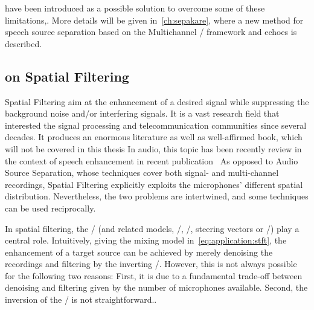  have been introduced as a possible solution to overcome some of these limitations,.
More details will be given in~\cref{ch:sepakare}, where a new method for speech source separation based on the Multichannel \NMF/ framework and echoes is described.

\subsection{on Spatial Filtering}\label{subsec:application:filtering}
Spatial Filtering aim at the enhancement of a desired signal while suppressing the background noise and/or interfering signals.
It is a vast research field that interested the signal processing and telecommunication communities since several decades.
It produces an enormous literature as well as well-affirmed book, which will not be covered in this thesis
In audio, this topic has been recently review in the context of speech enhancement in recent publication~
As opposed to Audio Source Separation, whose techniques cover both signal- and multi-channel recordings, Spatial Filtering explicitly exploits the microphones' different spatial distribution.
Nevertheless, the two problems are intertwined, and some techniques can be used reciprocally.

\mynewline
In spatial filtering, the \RIRs/ (and related models, \eg/, \RTFs/, steering vectors or \ReTFs/) play a central role.
Intuitively, giving the mixing model in~\cref{eq:application:stft}, the enhancement of a target source can be achieved by merely denoising the recordings and filtering by the inverting \RIRs/.
However, this is not always possible for the following two reasons:
First, it is due to a fundamental trade-off between denoising and filtering given by the number of microphones available.
Second, the inversion of the \RIRs/ is not straightforward..

